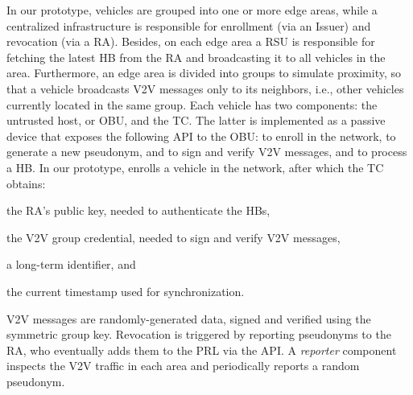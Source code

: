 In our prototype, vehicles are grouped into one or more edge areas, while a
centralized infrastructure is responsible for enrollment (via an Issuer) and
revocation (via a \ac{RA}). Besides, on each edge area a \ac{RSU} is responsible
for fetching the latest \ac{HB} from the \ac{RA} and broadcasting it to all
vehicles in the area. Furthermore, an edge area is divided into groups to
simulate proximity, so that a vehicle broadcasts \ac{V2V} messages only to its
neighbors, i.e., other vehicles currently located in the same group. Each
vehicle has two components: the untrusted host, or \ac{OBU}, and the \ac{TC}.
The latter is implemented as a passive device that exposes the following API to
the \ac{OBU}: \funcjoin{} to enroll in the network, \funcissue{} to generate a
new pseudonym, \funcsign{} and \funcverify{} to sign and verify \ac{V2V}
messages, and \funcheartbeat{} to process a \ac{HB}. In our prototype,
\funcjoin{} enrolls a vehicle in the network, after which the \ac{TC} obtains: %
%
\begin{inparaenum}
    \item the \ac{RA}'s public key, needed to authenticate the \acp{HB},
    \item the \ac{V2V} group credential, needed to sign and verify \ac{V2V}
    messages,
    \item a long-term identifier, and
    \item the current timestamp used for synchronization.
\end{inparaenum}

\ac{V2V} messages are randomly-generated data, signed and verified using the
symmetric group key. Revocation is triggered by reporting pseudonyms to the
\ac{RA}, who eventually adds them to the \ac{PRL} via the \funcrevokedaa{}
API. A \emph{reporter} component inspects the
\ac{V2V} traffic in each area and periodically reports a random pseudonym.

